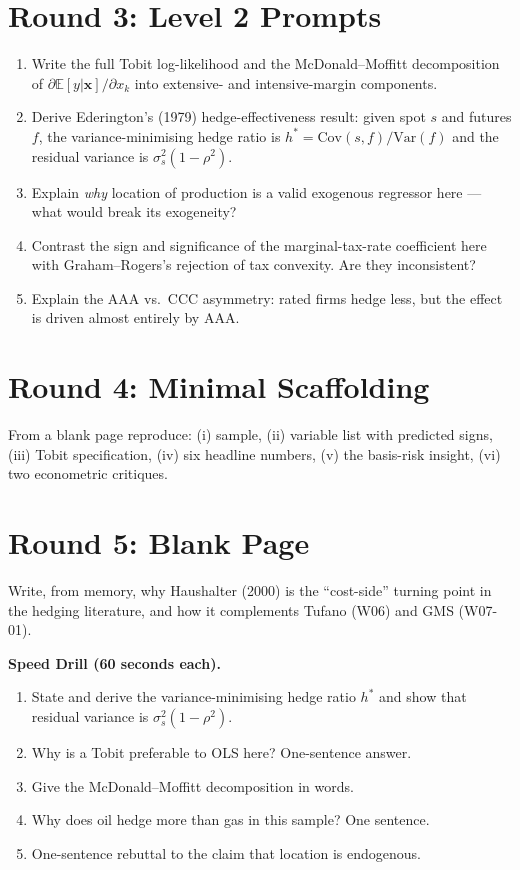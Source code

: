 \documentclass[11pt]{article}
\newcommand{\EV}{\mathbb{E}}
\begin{document}
\section*{Round 3: Level 2 Prompts}
\begin{enumerate}
\item Write the full Tobit log-likelihood and the McDonald--Moffitt decomposition of $\partial\EV[y|\mathbf x]/\partial x_k$ into extensive- and intensive-margin components.
\item Derive Ederington's (1979) hedge-effectiveness result: given spot $s$ and futures $f$, the variance-minimising hedge ratio is $h^*=\text{Cov}(s,f)/\text{Var}(f)$ and the residual variance is $\sigma_s^2(1-\rho^2)$.
\item Explain \emph{why} location of production is a valid exogenous regressor here --- what would break its exogeneity?
\item Contrast the sign and significance of the marginal-tax-rate coefficient here with Graham--Rogers's rejection of tax convexity. Are they inconsistent?
\item Explain the AAA vs.\ CCC asymmetry: rated firms hedge less, but the effect is driven almost entirely by AAA.
\end{enumerate}

\section*{Round 4: Minimal Scaffolding}
From a blank page reproduce: (i) sample, (ii) variable list with predicted signs, (iii) Tobit specification, (iv) six headline numbers, (v) the basis-risk insight, (vi) two econometric critiques.

\section*{Round 5: Blank Page}
Write, from memory, why Haushalter (2000) is the ``cost-side'' turning point in the hedging literature, and how it complements Tufano (W06) and GMS (W07-01).

\vspace{6pt}
\begin{drillbox}
\textbf{Speed Drill (60 seconds each).}
\begin{enumerate}
\item State and derive the variance-minimising hedge ratio $h^*$ and show that residual variance is $\sigma_s^2(1-\rho^2)$.
\item Why is a Tobit preferable to OLS here? One-sentence answer.
\item Give the McDonald--Moffitt decomposition in words.
\item Why does oil hedge more than gas in this sample? One sentence.
\item One-sentence rebuttal to the claim that location is endogenous.
\end{enumerate}
\end{drillbox}
\end{document}
